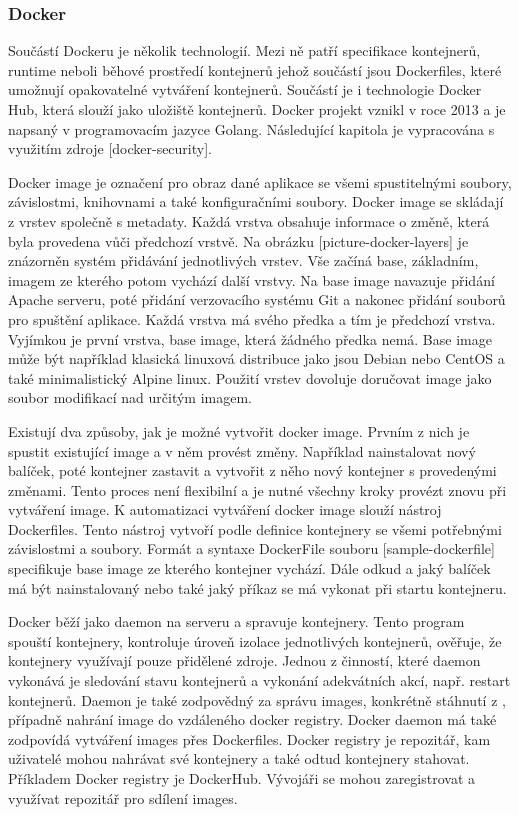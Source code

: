 \subsubsection{Docker}
Součástí Dockeru je několik technologií. Mezi ně patří specifikace kontejnerů, runtime neboli běhové prostředí kontejnerů jehož součástí jsou Dockerfiles, které umožnují opakovatelné vytváření kontejnerů. Součástí je i technologie Docker Hub, která slouží jako uložiště kontejnerů. Docker projekt vznikl v roce 2013 a je napsaný v programovacím jazyce Golang. Následující kapitola je vypracována s využitím zdroje [docker-security].\par
Docker image je označení pro obraz dané aplikace se všemi spustitelnými soubory, závislostmi, knihovnami a také konfiguračními soubory. Docker image se skládají z vrstev společně s metadaty. Každá vrstva obsahuje informace o změně, která byla provedena vůči předchozí vrstvě. Na obrázku [picture-docker-layers] je znázorněn systém přidávání jednotlivých vrstev. Vše začíná base, základním, imagem ze kterého potom vychází další vrstvy. Na base image navazuje přidání Apache serveru, poté přidání verzovacího systému Git a nakonec přidání souborů pro spuštění aplikace. Každá vrstva má svého předka a tím je předchozí vrstva. Vyjímkou je první vrstva, base image, která žádného předka nemá. Base image může být například klasická linuxová distribuce jako jsou Debian nebo CentOS a také minimalistický Alpine linux. Použití vrstev dovoluje doručovat image jako soubor modifikací nad určitým imagem. \par
Existují dva způsoby, jak je možné vytvořit docker image. Prvním z nich je spustit existující image a v něm provést změny. Například nainstalovat nový balíček, poté kontejner zastavit a vytvořit z něho nový kontejner s provedenými změnami. Tento proces není flexibilní a je nutné všechny kroky provézt znovu při vytváření image. K automatizaci vytváření docker image slouží nástroj Dockerfiles. Tento nástroj vytvoří podle definice kontejnery se všemi potřebnými závislostmi a soubory. Formát a syntaxe DockerFile souboru [sample-dockerfile] specifikuje base image ze kterého kontejner vychází. Dále odkud a jaký balíček má být nainstalovaný nebo také jaký příkaz se má vykonat při startu kontejneru. \par
Docker běží jako daemon na serveru a spravuje kontejnery. Tento program spouští kontejnery, kontroluje úroveň izolace jednotlivých kontejnerů, ověřuje, že kontejnery využívají pouze přidělené zdroje. Jednou z činností, které daemon vykonává je sledování stavu kontejnerů a vykonání adekvátních akcí, např. restart kontejnerů. Daemon je také zodpovědný za správu images, konkrétně stáhnutí z , případně nahrání image do vzdáleného docker registry. Docker daemon má také zodpovídá vytváření images přes Dockerfiles. Docker registry je repozitář, kam uživatelé mohou nahrávat své kontejnery a také odtud kontejnery stahovat. Příkladem Docker registry je DockerHub. Vývojáři se mohou zaregistrovat a využívat repozitář pro sdílení images. \par
